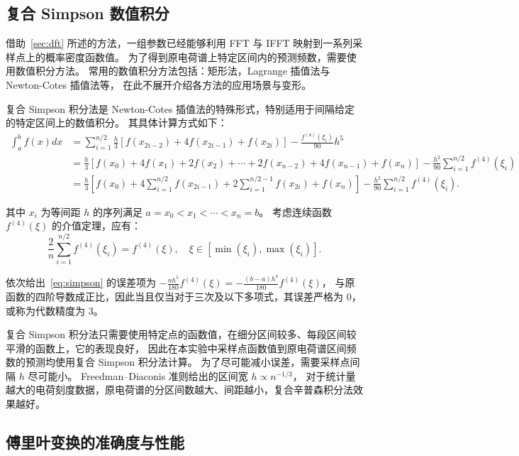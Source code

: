\subsection{复合 Simpson 数值积分}

借助~\ref{sec:dft} 所述的方法，一组参数已经能够利用 FFT 与 IFFT 映射到一系列采样点上的概率密度函数值。
为了得到原电荷谱上特定区间内的预测频数，需要使用数值积分方法。
常用的数值积分方法包括：矩形法，Lagrange 插值法与 Newton-Cotes 插值法等，
在此不展开介绍各方法的应用场景与变形。

复合 Simpson 积分法是 Newton-Cotes 插值法的特殊形式，特别适用于间隔给定的特定区间上的数值积分。
其具体计算方式如下：
\begin{equation}
    \begin{aligned}
        \int_{a}^{b}f(x) dx
        &=\sum_{i=1}^{n/2}\frac{h}{3}\left[f(x_{2i-2})+4f(x_{2i-1})+f(x_{2i})\right]-\frac{f^{(4)}(\xi_i)}{90}h^5 \\
        &=\frac{h}{3}\left[f(x_0)+4f(x_1)+2f(x_2)+\cdots+2f(x_{n-2})+4f(x_{n-1})+f(x_n)\right]
        -\frac{h^2}{90}\sum_{i=1}^{n/2}f^{(4)}(\xi_i) \\
        &=\frac{h}{3}\left[f(x_{0})+4\sum_{i=1}^{n/2}f(x_{2i-1})+2\sum_{i=1}^{n/2-1}f(x_{2i})+f(x_{n})\right]
        -\frac{h^2}{90}\sum_{i=1}^{n/2}f^{(4)}(\xi_i).
    \end{aligned}
    \label{eq:simpson}
\end{equation}

其中 $x_i$ 为等间距 $h$ 的序列满足 $a=x_0<x_1<\cdots<x_n=b$。
考虑连续函数 $f^{(4)}(\xi)$ 的介值定理，应有：
\begin{equation}
    \frac{2}{n}\sum_{i=1}^{n/2}f^{(4)}(\xi_i)=f^{(4)}(\xi),\quad\xi\in\left[\min(\xi_i), \max(\xi_i)\right].
\end{equation}

依次给出~\eqref{eq:simpson} 的误差项为 $-\frac{nh^5}{180}f^{(4)}(\xi)=-\frac{(b-a)h^4}{180}f^{(4)}(\xi)$，
与原函数的四阶导数成正比，因此当且仅当对于三次及以下多项式，其误差严格为 0，或称为代数精度为 3。

复合 Simpson 积分法只需要使用特定点的函数值，在细分区间较多、每段区间较平滑的函数上，它的表现良好，
因此在本实验中采样点函数值到原电荷谱区间频数的预测均使用复合 Simpson 积分法计算。
为了尽可能减小误差，需要采样点间隔 $h$ 尽可能小。
Freedman–Diaconis 准则给出的区间宽 $h\propto n^{-1/3}$，
对于统计量越大的电荷刻度数据，原电荷谱的分区间数越大、间距越小，复合辛普森积分法效果越好。

\subsection{傅里叶变换的准确度与性能}

